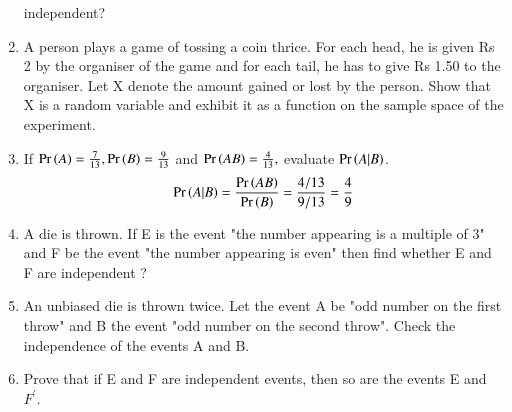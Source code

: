 \begin{enumerate}[label=\thesection.\arabic*.,ref=\thesection.\theenumi]
independent?\\
\solution

%
\item A person plays a game of tossing a coin thrice. For each head, he is given Rs 2 by the organiser of the game and for each tail, he has to give Rs 1.50 to the organiser. Let X denote the amount gained or lost by the person. Show that X is a random variable and exhibit it as a function on the sample space of the experiment.\\
\solution


\item If $\Pr\left(A\right)= \frac{7}{13}, \Pr\left(B\right)=\frac{9}{13}$ and $\Pr\left(AB\right)=\frac{4}{13},$ evaluate $\Pr\left(A|B\right)$.
\\
\solution 
\begin{align}
\Pr\left(A|B\right) = \frac{\Pr\left(AB\right)}{\Pr\left(B\right)} = \frac{4/13}{9/13} = \frac{4}{9}
\end{align}
\item A die is thrown. If E is the event "the number appearing is a multiple of 3" and F be the event "the number appearing is even" then find whether E and F are independent ?\\
\solution


\item An unbiased die is thrown twice. Let the event A be "odd number on the first throw" and B the event "odd number on the second throw". Check the independence of the events A and B.\\
\solution



\item Prove that if E and F are independent events, then so are the events E and $F^{'}$.\\
\solution



\end{enumerate}

